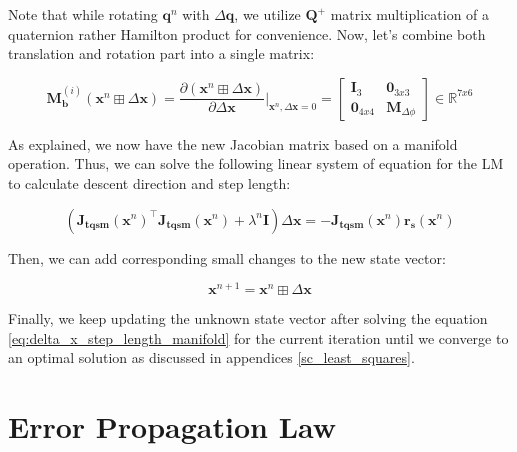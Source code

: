 \documentclass[a4paper]{report}
\numberwithin{figure}{section}
\newcommand{\R}{\mathbb{R}}
\begin{document}
\begin{appendices}
Note that while rotating $\mathbf{q}^n$ with $\Delta \mathbf{\mathbf{q}}$, 
we utilize $\mathbf{Q}^{+}$ matrix multiplication of a quaternion rather Hamilton product 
for convenience.
Now, let's combine both translation and rotation part into a single matrix:

\begin{equation}
\mathbf{M}_{\mathbf{b}}^{(i)}(\mathbf{x}^n \boxplus \Delta \mathbf{x}) = 
    \frac{\partial (\mathbf{x}^n \boxplus \Delta \mathbf{x})}
  {\partial \Delta \mathbf{x}} \bigg|_{\mathbf{x}^n,\Delta \mathbf{x}=0} = 
  \begin{bmatrix} 
  \mathbf{I}_3 & \mathbf{0}_{3x3} \\ 
  \mathbf{0}_{4x4} & \mathbf{M}_{\Delta \phi}   
  \end{bmatrix}
  \in \R^{7x6}
\end{equation}

As explained, we now have the new Jacobian matrix based on a manifold operation.
Thus, we can solve the following linear system of equation for the LM 
to calculate descent direction and step length:

\begin{equation}\label{eq:delta_x_step_length_manifold}
  (\mathbf{J_{tqsm}}(\mathbf{x}^n)^\top\mathbf{J_{tqsm}}(\mathbf{x}^n) 
  + \lambda^n \mathbf{I})
  \Delta \mathbf{x} =  
  -\mathbf{J_{tqsm}}(\mathbf{x}^n)\mathbf{r_s}(\mathbf{x}^n)
\end{equation}

Then, we can add corresponding small changes to the new state vector:

\begin{equation}
  \mathbf{x}^{n+1} = \mathbf{x}^{n} \boxplus \Delta \mathbf{x}
\end{equation}

Finally, we keep updating the unknown state vector after solving 
the equation \eqref{eq:delta_x_step_length_manifold} for the current iteration 
until we converge to an optimal solution as discussed in appendices \ref{sc_least_squares}.

\section{Error Propagation Law} \label{sc_error_prop_law}


\end{appendices}
\end{document}
